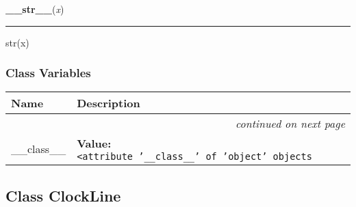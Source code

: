     \vspace{0.5ex}

    \begin{boxedminipage}{\textwidth}

    \raggedright \textbf{\_\_str\_\_}(\textit{x})

    \vspace{-1.5ex}

    \rule{\textwidth}{0.5\fboxrule}
    str(x)

    \vspace{1ex}

    \end{boxedminipage}



  \subsubsection{Class Variables}

\begin{longtable}{|p{}|p{}|l}
\cline{1-2}
\cline{1-2} \centering \textbf{Name} & \centering \textbf{Description}& \\
\cline{1-2}
\endhead\cline{1-2}\multicolumn{3}{r}{\small\textit{continued on next page}}\\\endfoot\cline{1-2}
\endlastfoot\raggedright \_\-\_\-c\-l\-a\-s\-s\-\_\-\_\- & \textbf{Value:} 
{\tt {\textless}\-a\-t\-t\-r\-i\-b\-u\-t\-e\-~\-'\-\_\-\_\-c\-l\-a\-s\-s\-\_\-\_\-'\-~\-o\-f\-~\-'\-o\-b\-j\-e\-c\-t\-'\-~\-o\-b\-j\-e\-c\-t\-s\-{\textgreater}\-}&\\
\cline{1-2}
\end{longtable}



\subsection{Class ClockLine}

